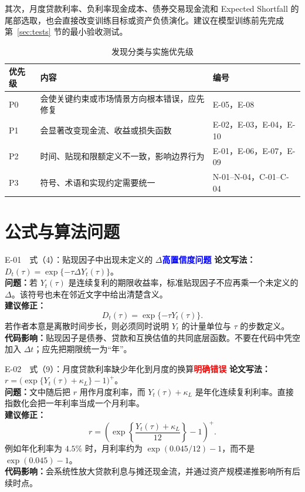 \documentclass[UTF8,11pt,a4paper,fontset=fandol]{ctexart}
\newcommand{\tagdefinite}{\textcolor{red}{\textbf{明确错误}}}
\newcommand{\taghigh}{\textcolor{blue}{\textbf{高置信度问题}}}
\newcommand{\original}{\textbf{论文写法：}}
\newcommand{\problem}{\textbf{问题：}}
\newcommand{\revision}{\textbf{建议修正：}}
\newcommand{\impact}{\textbf{代码影响：}}
\begin{document}
其次，月度贷款利率、负利率现金成本、债券交易现金流和 Expected Shortfall 的尾部选取，也会直接改变训练目标或资产负债演化。建议在模型训练前先完成第~\ref{sec:tests} 节的最小验收测试。

\begin{table}[htbp]
\centering
\caption{发现分类与实施优先级}
\begin{tabularx}{\textwidth}{@{}lYl@{}}
\toprule
优先级 & 内容 & 编号 \\
\midrule
P0 & 会使关键约束或市场情景方向根本错误，应先修复 & E-05，E-08 \\
P1 & 会显著改变现金流、收益或损失函数 & E-02，E-03，E-04，E-10 \\
P2 & 时间、贴现和限额定义不一致，影响边界行为 & E-01，E-06，E-07，E-09 \\
P3 & 符号、术语和实现约定需要统一 & N-01--N-04，C-01--C-04 \\
\bottomrule
\end{tabularx}
\end{table}

\section{公式与算法问题}

\begin{fixbox}{E-01　式（4）：贴现因子中出现未定义的 $\Delta$\hfill\taghigh}
\original $D_t(\tau)=\exp\{-\tau\Delta Y_t(\tau)\}$。\\
\problem 若 $Y_t(\tau)$ 是连续复利的期限收益率，标准贴现因子不应再乘一个未定义的 $\Delta$。该符号也未在邻近文字中给出清楚含义。\\
\revision
\[
  D_t(\tau)=\exp\{-\tau Y_t(\tau)\}.
\]
若作者本意是离散时间步长，则必须同时说明 $Y_t$ 的计量单位与 $\tau$ 的步数定义。\\
\impact 贴现因子是债券、贷款和互换估值的共同底层函数。不要在代码中凭空加入 $\Delta t$；应先把期限统一为“年”。
\end{fixbox}

\begin{fixbox}{E-02　式（9）：月度贷款利率缺少年化到月度的换算\hfill\tagdefinite}
\original $r=\bigl(\exp\{Y_t(\tau)+\kappa_L\}-1\bigr)^+$。\\
\problem 文中随后把 $r$ 用作月度利率，而 $Y_t(\tau)+\kappa_L$ 是年化连续复利利率。直接指数化会把一年利率当成一个月利率。\\
\revision
\[
  r=\left(\exp\left\{\frac{Y_t(\tau)+\kappa_L}{12}\right\}-1\right)^+.
\]
例如年化利率为 $4.5\%$ 时，月利率约为 $\exp(0.045/12)-1$，而不是 $\exp(0.045)-1$。\\
\impact 会系统性放大贷款利息与摊还现金流，并通过资产规模递推影响所有后续时点。
\end{fixbox}
\end{document}
